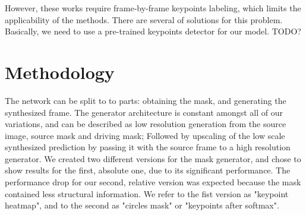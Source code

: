\documentclass{article}
\begin{document}
However, these works require frame-by-frame keypoints labeling,
which limits the applicability of the methods.
There are several of solutions for this problem.
Basically, we need to use a pre-trained keypoints detector for our model.
\cite{siarohin2019animating} \cite{thewlis2017unsupervised}
\cite{zhang2018unsupervised} \cite{jakab2018unsupervised}
\cite{newell2016stacked}
TODO?


\section{Methodology}
The network can be split to to parts: obtaining the mask, and generating
the synthesized frame. The generator architecture is constant amongst all of
our variations, and can be described as low resolution generation from the
source image, source mask and driving mask; Followed by upscaling of the
low scale synthesized prediction by passing it with the source frame to a
high resolution generator.
We created two different versions for the mask generator, and chose to show
results for the first, absolute one, due to its significant performance. The
performance drop for our second, relative version was expected because the
mask contained less structural information.
We refer to the fist version as "keypoint heatmap", and to the second as
"circles mask" or "keypoints after softmax".
\end{document}
